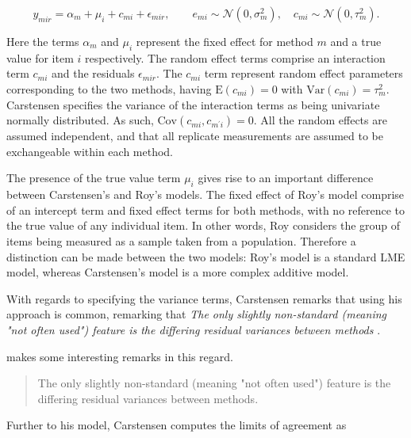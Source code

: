 \documentclass[12pt, a4paper]{report}
\theoremstyle{plain}
\theoremstyle{definition}
\theoremstyle{remark}
\begin{document}
\begin{equation}
y_{mir}  = \alpha_{m} + \mu_{i} + c_{mi} + \epsilon_{mir}, \qquad  e_{mi}
\sim \mathcal{N}(0,\sigma^{2}_{m}), \quad c_{mi} \sim \mathcal{N}(0,\tau^{2}_{m}).
\end{equation}

Here the terms $\alpha_{m}$ and $\mu_{i}$ represent the fixed effect for method $m$ and a true value for item $i$ respectively. The random effect terms comprise an interaction term $c_{mi}$ and the residuals $\epsilon_{mir}$.
The $c_{mi}$ term represent random effect parameters corresponding to the two methods, having $\mathrm{E}(c_{mi})=0$ with $\mathrm{Var}(c_{mi})=\tau^2_m$. Carstensen specifies the variance of the interaction terms as being univariate normally distributed. As such, $\mathrm{Cov}(c_{mi}, c_{m^\prime i})= 0.$ All the random effects are assumed independent, and that all replicate measurements are assumed to be exchangeable within each method.


The presence of the true value term $\mu_i$ gives rise to an important difference between Carstensen's and Roy's models. The fixed effect of Roy's model comprise of an intercept term and fixed effect terms for both methods, with no reference to the true value of any individual item. In other words, Roy considers the group of items being measured as a sample taken from a population. Therefore a distinction can be made between the two models: Roy's model is a standard LME model, whereas Carstensen's model is a more complex additive model.



With regards to specifying the variance terms, Carstensen remarks that using his approach is common, remarking that \emph{
	The only slightly non-standard (meaning "not often used") feature is the differing residual variances between methods }\citep{bxc2010}.

\citet{BXC2008} makes some interesting remarks in this regard.

\begin{quote}
	The only slightly non-standard (meaning "not often used") feature
	is the differing residual variances between methods.
\end{quote}

Further to his model, Carstensen computes the limits of agreement
as
\end{document}
